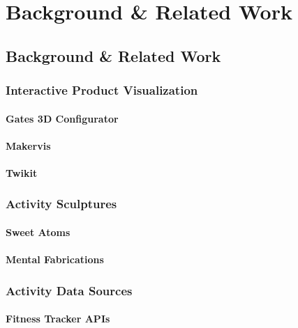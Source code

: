 \chapter{Background \& Related Work}
\label{ch:related}
\section{Background \& Related Work}
\subsection{Interactive Product Visualization}
\subsubsection{Gates 3D Configurator}
\subsubsection{Makervis}
\subsubsection{Twikit}
\subsection{Activity Sculptures}
\subsubsection{Sweet Atoms}
\subsubsection{Mental Fabrications}
\subsection{Activity Data Sources}
\subsubsection{Fitness Tracker APIs}
